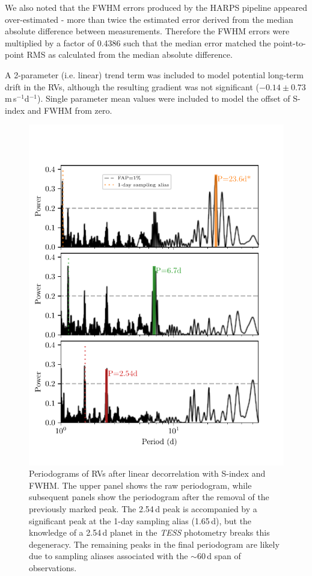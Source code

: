 \documentclass[fleqn,usenatbib]{mnras}
\newcommand{\tess}{{\it TESS}}
\newcommand{\harps}{{HARPS}}
\newcommand{\ms}{m\,s$^{-1}$}
\begin{document}
We also noted that the FWHM errors produced by the \harps{} pipeline appeared over-estimated - more than twice the estimated error derived from the median absolute difference between measurements.
Therefore the FWHM errors were multiplied by a factor of 0.4386 such that the median error matched the point-to-point RMS as calculated from the median absolute difference.

A 2-parameter (i.e. linear) trend term was included to model potential long-term drift in the RVs, although the resulting gradient was not significant ($-0.14\pm0.73$\,\ms{}d$^{-1}$).
Single parameter mean values were included to model the offset of S-index and FWHM from zero.


\begin{figure}
	\includegraphics[width=\columnwidth, trim={0.3cm 1.1cm 0.8cm 1.3cm}]{TOI755_decorrelation_periodograms}
    \caption{Periodograms of RVs after linear decorrelation with S-index and FWHM. The upper panel shows the raw periodogram, while subsequent panels show the periodogram after the removal of the previously marked peak. The 2.54\,d peak is accompanied by a significant peak at the 1-day sampling alias (1.65\,d), but the knowledge of a 2.54\,d planet in the \tess{} photometry breaks this degeneracy. The remaining peaks in the final periodogram are likely due to sampling aliases associated with the $\sim60$\,d span of observations.}
    \label{fig:rv_decorr}
\end{figure}
\end{document}
